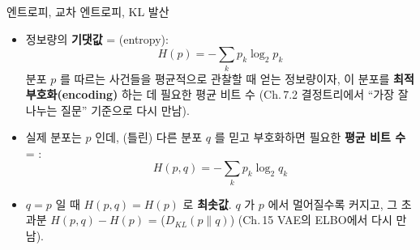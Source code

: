 \documentclass[aspectratio=169,11pt]{beamer}
\begin{document}
\begin{frame}{엔트로피, 교차 엔트로피, KL 발산}
  \begin{itemize}
    \item 정보량의 \textbf{기댓값} = (entropy):
      \[H(p) = -\sum_k p_k \log_2 p_k\]
      분포 $p$ 를 따르는 사건들을 평균적으로 관찰할 때 얻는
      정보량이자, 이 분포를 \textbf{최적 부호화(encoding)} 하는 데
      필요한 평균 비트 수 (Ch.\,7.2 결정트리에서 ``가장 잘 나누는
      질문'' 기준으로 다시 만남).
    \item 실제 분포는 $p$ 인데, (틀린) 다른 분포 $q$ 를 믿고
      부호화하면 필요한 \textbf{평균 비트 수} = :
      \[H(p, q) = -\sum_k p_k \log_2 q_k\]
    \item $q = p$ 일 때 $H(p, q) = H(p)$ 로 \textbf{최솟값}.
      $q$ 가 $p$ 에서 멀어질수록 커지고, 그 초과분
      $H(p, q) - H(p)$ = ($D_{KL}(p\|q)$)
      (Ch.\,15 VAE의 ELBO에서 다시 만남).
  \end{itemize}
\end{frame}

\end{document}
